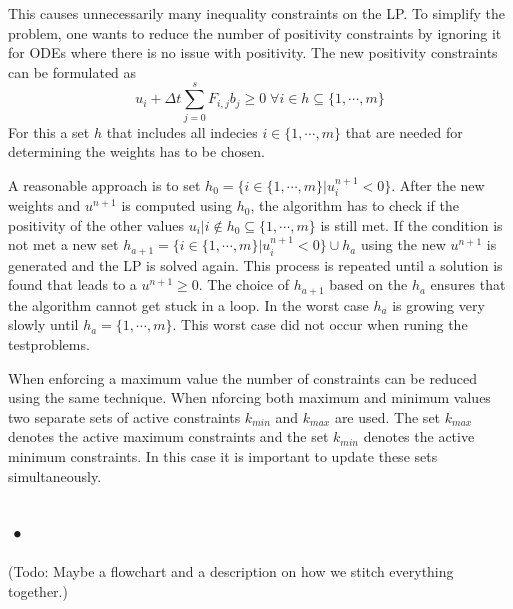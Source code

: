 \documentclass[a4paper]{scrartcl}
\numberwithin{equation}{section}
\theoremstyle{plain}
\theoremstyle{definition}
\numberwithin{theorem}{section}
\newcommand{\dt}{{\Delta t}}
\newcommand{\1}{\mathbbm{1}}
\begin{document}
This causes unnecessarily many inequality constraints on the LP. To simplify the problem, one wants to reduce the number of positivity constraints by ignoring it for ODEs where there is no issue with positivity.
The new positivity constraints can be formulated as
\begin{equation}
u_i + \dt \sum_{j=0}^s F_{i,j}  b_j  \geq 0   \;   \forall {i \in h \subseteq \{1,\cdots,m \}} 
\end{equation}
For this a set $h$ that includes all indecies $i \in \{1,\cdots,m \}$ that are needed for determining the weights has to be chosen.

A reasonable approach is to set $h_0 = \{ i \in \{1,\cdots,m \} |  u_i^{n+1}  < 0 \}$. 
After the new weights and $u^{n+1}$ is computed using $h_0$, the algorithm has to check if the positivity of the other values $u_i | i \notin h_0 \subseteq \{1,\cdots,m \}$ is still met. 
If the condition is not met a new set $h_{a+1} = \{ i \in \{1,\cdots,m \}|  u_i^{n+1}  < 0 \} \cup h_{a}$ using the new $u^{n+1}$ is generated and the LP is solved again. This process is repeated until a solution is found that leads to a $u^{n+1} \geq 0$. The choice of $h_{a+1}$ based on the $h_{a}$ ensures that the algorithm cannot get stuck in a loop. In the worst case $h_a$ is growing very slowly until $h_a = \{1,\cdots,m \}$. 
This worst case did not occur when runing the testproblems. 

When enforcing a maximum value the number of constraints can be reduced using the same technique. When nforcing both maximum and minimum values two separate sets of active constraints $k_{min}$ and $k_{max}$ are used. The set $k_{max}$ denotes the active maximum constraints and the set $k_{min}$ denotes the active minimum constraints. 
In this case it is important to update these sets simultaneously.  

\subsection{•}
(Todo: Maybe a flowchart and a description on how we stitch everything together.) 
\end{document}
